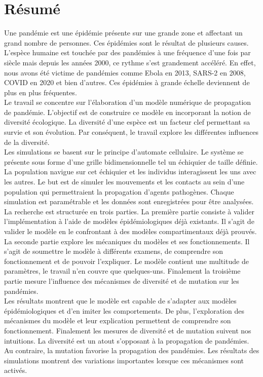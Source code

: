 \chapter{Résumé} \label{ch:resume}

Une pandémie est une épidémie présente sur une grande zone et affectant un grand nombre de personnes. Ces épidémies sont le résultat de plusieurs causes. L'espèce humaine est touchée par des pandémies à une fréquence d'une fois par siècle mais depuis les années 2000, ce rythme s'est grandement accéléré. En effet, nous avons été victime de pandémies comme Ebola en 2013, SARS-2 en 2008, COVID en 2020 et bien d'autres. Ces épidémies à grande échelle deviennent de plus en plus fréquentes.\\

Le travail se concentre sur l'élaboration d'un modèle numérique de propagation de pandémie. L'objectif est de construire ce modèle en incorporant la notion de diversité écologique. La diversité d'une espèce est un facteur clef permettant sa survie et son évolution. Par conséquent, le travail explore les différentes influences de la diversité.\\

Les simulations se basent sur le principe d'automate cellulaire. Le système se présente sous forme d'une grille bidimensionnelle tel un échiquier de taille définie. La population navigue sur cet échiquier et les individus interagissent les uns avec les autres. Le but est de simuler les mouvements et les contacts au sein d'une population qui permettraient la propagation d'agents pathogènes. Chaque simulation est paramétrable et les données sont enregistrées pour être analysées.\\

La recherche est structurée en trois parties. La première partie consiste à valider l'implémentation à l'aide de modèles épidémiologiques déjà existants. Il s'agit de valider le modèle en le confrontant à des modèles compartimentaux déjà prouvés. La seconde partie explore les mécaniques du modèles et ses fonctionnements. Il s'agit de soumettre le modèle à différents examens, de comprendre son fonctionnement et de pouvoir l'expliquer. Le modèle contient une multitude de paramètres, le travail n'en couvre que quelques-uns. Finalement la troisième partie mesure l'influence des mécanismes de diversité et de mutation sur les pandémies.\\

Les résultats montrent que le modèle est capable de s'adapter aux modèles épidémiologiques et d'en imiter les comportements. De plus, l'exploration des mécanismes du modèle et leur explication permettent de comprendre son fonctionnement. Finalement les mesures de diversité et de mutation suivent nos intuitions. La diversité est un atout s'opposant à la propagation de pandémies. Au contraire, la mutation favorise la propagation des pandémies. Les résultats des simulations montrent des variations importantes lorsque ces mécanismes sont activés.
